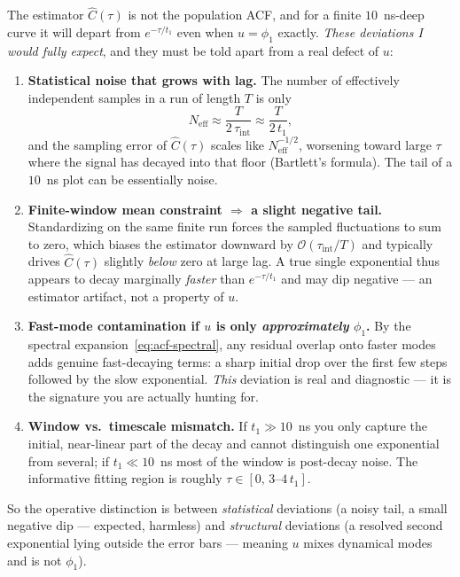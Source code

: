 \documentclass[11pt]{article}
\theoremstyle{plain}
\theoremstyle{definition}
\begin{document}
The estimator $\widehat C(\tau)$ is not the population ACF, and for a finite
$10$~ns-deep curve it will depart from $e^{-\tau/t_1}$ even when $u=\phi_1$ exactly.
\emph{These deviations I would fully expect}, and they must be told apart from a real
defect of $u$:
\begin{enumerate}[leftmargin=2em,itemsep=3pt]
\item \textbf{Statistical noise that grows with lag.} The number of effectively
independent samples in a run of length $T$ is only
\begin{equation}
N_{\mathrm{eff}}\approx \frac{T}{2\,\tau_{\mathrm{int}}}\approx\frac{T}{2\,t_1},
\end{equation}
and the sampling error of $\widehat C(\tau)$ scales like $N_{\mathrm{eff}}^{-1/2}$,
worsening toward large $\tau$ where the signal has decayed into that floor (Bartlett's
formula). The tail of a $10$~ns plot can be essentially noise.
\item \textbf{Finite-window mean constraint $\Rightarrow$ a slight negative tail.}
Standardizing on the same finite run forces the sampled fluctuations to sum to zero,
which biases the estimator downward by $\mathcal O(\tau_{\mathrm{int}}/T)$ and
typically drives $\widehat C(\tau)$ slightly \emph{below} zero at large lag. A true
single exponential thus appears to decay marginally \emph{faster} than $e^{-\tau/t_1}$
and may dip negative --- an estimator artifact, not a property of $u$.
\item \textbf{Fast-mode contamination if $u$ is only \emph{approximately} $\phi_1$.}
By the spectral expansion~\eqref{eq:acf-spectral}, any residual overlap onto faster
modes adds genuine fast-decaying terms: a sharp initial drop over the first few steps
followed by the slow exponential. \emph{This} deviation is real and diagnostic --- it
is the signature you are actually hunting for.
\item \textbf{Window vs.\ timescale mismatch.} If $t_1\gg10$~ns you only capture the
initial, near-linear part of the decay and cannot distinguish one exponential from
several; if $t_1\ll10$~ns most of the window is post-decay noise. The informative
fitting region is roughly $\tau\in[0,\,3\text{--}4\,t_1]$.
\end{enumerate}
So the operative distinction is between \emph{statistical} deviations (a noisy tail, a
small negative dip --- expected, harmless) and \emph{structural} deviations (a
resolved second exponential lying outside the error bars --- meaning $u$ mixes
dynamical modes and is not $\phi_1$).
\end{document}
